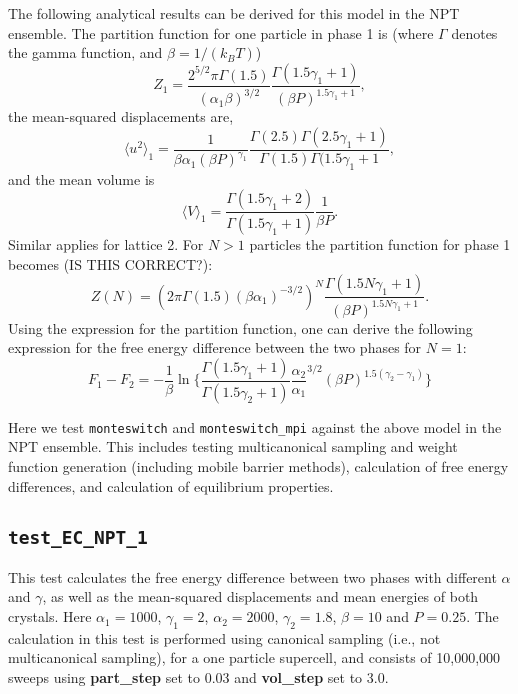 \documentclass{report}
\begin{document}
The following analytical results can be derived for this model in the NPT ensemble.
The partition function for one particle in phase 1 is (where $\Gamma$ denotes the gamma function, and $\beta=1/(k_BT)$)
\begin{equation}
Z_1=\frac{2^{5/2}\pi\Gamma(1.5)}{(\alpha_1\beta)^{3/2}}\frac{\Gamma(1.5\gamma_1+1)}{(\beta P)^{1.5\gamma_1+1}},
\end{equation}
the mean-squared displacements are,
\begin{equation}
\langle u^2\rangle_1=\frac{1}{\beta\alpha_1(\beta P)^{\gamma_1}}\frac{\Gamma(2.5)\Gamma(2.5\gamma_1+1)}{\Gamma(1.5)\Gamma(1.5\gamma_1+1},
\end{equation}
and the mean volume is
\begin{equation}
\langle V\rangle_1=\frac{\Gamma(1.5\gamma_1+2)}{\Gamma(1.5\gamma_1+1)}\frac{1}{\beta P}.
\end{equation}
Similar applies for lattice 2.
For $N>1$ particles the partition function for phase 1 becomes (IS THIS CORRECT?):
\begin{equation}
Z(N)=(2\pi\Gamma(1.5)(\beta\alpha_1)^{-3/2})^N\frac{\Gamma(1.5N\gamma_1+1)}{(\beta P)^{1.5N\gamma_1+1}}.
\end{equation}
Using the expression for the partition function, one can derive the following expression for the free energy difference
between the two phases for $N=1$:
\begin{equation}
F_1-F_2=-\frac{1}{\beta}\ln\Biggl\lbrace 
\frac{\Gamma(1.5\gamma_1+1)}{\Gamma(1.5\gamma_2+1)}\frac{\alpha_2}{\alpha_1}^{3/2}(\beta P)^{1.5(\gamma_2-\gamma_1)}
\Biggr\rbrace
\end{equation}

Here we test \texttt{monteswitch} and \texttt{monteswitch\_mpi} against the above model in the
NPT ensemble. This includes testing multicanonical sampling and weight function generation (including
mobile barrier methods), calculation of free energy differences, and calculation of equilibrium properties.


\subsection{\texttt{test\_EC\_NPT\_1}}
This test calculates the free energy difference between two phases with different $\alpha$ and $\gamma$,
as well as the mean-squared displacements and mean energies of both crystals. Here $\alpha_1=1000$, $\gamma_1=2$,
$\alpha_2=2000$, $\gamma_2=1.8$, $\beta=10$ and $P=0.25$. The calculation in this test is performed using canonical
sampling (i.e., not multicanonical sampling), for a one particle supercell, and consists of 10,000,000 sweeps 
using \textbf{part\_step} set to 0.03 and \textbf{vol\_step} set to 3.0.
\end{document}
